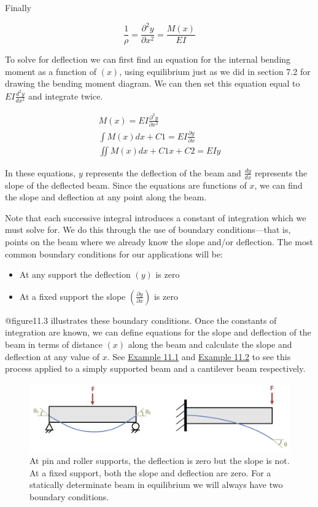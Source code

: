 \documentclass[
  letterpaper,
  DIV=11,
  numbers=noendperiod]{scrreprt}
\begin{document}
Finally

\[
\frac{1}{\rho}=\frac{\partial^{2} y}{\partial x^{2}}=\frac{M(x)}{E I}
\]

To solve for deflection we can first find an equation for the internal
bending moment as a function of \((x)\), using equilibrium just as we
did in section 7.2 for drawing the bending moment diagram. We can then
set this equation equal to \(E I \frac{d^{2} y}{d x^{2}}\) and integrate
twice.

\[
\begin{gathered}
M(x)=E I \frac{\partial^{2} y}{\partial x^{2}} \\
\int M(x) d x+C 1=E I \frac{\partial y}{\partial x} \\
\iint M(x) d x+C 1 x+C 2=E I y
\end{gathered}
\]

In these equations, \(y\) represents the deflection of the beam and
\(\frac{d y}{d x}\) represents the slope of the deflected beam. Since
the equations are functions of \(x\), we can find the slope and
deflection at any point along the beam.

Note that each successive integral introduces a constant of integration
which we must solve for. We do this through the use of boundary
conditions---that is, points on the beam where we already know the slope
and/or deflection. The most common boundary conditions for our
applications will be:

\begin{itemize}
\item
  At any support the deflection \((y)\) is zero
\item
  At a fixed support the slope
  \(\left(\frac{\partial y}{\partial x}\right)\) is zero
\end{itemize}

@figure11.3 illustrates these boundary conditions. Once the constants of
integration are known, we can define equations for the slope and
deflection of the beam in terms of distance \((x)\) along the beam and
calculate the slope and deflection at any value of \(x\). See
\hyperref[example-11.1]{Example 11.1} and
\hyperref[example-11.2]{Example 11.2} to see this process applied to a
simply supported beam and a cantilever beam respectively.

\begin{figure}

{\centering \includegraphics{images/CH11 PNGs/11.3.png}

}

\caption{At pin and roller supports, the deflection is zero but the
slope is not. At a fixed support, both the slope and deflection are
zero. For a statically determinate beam in equilibrium we will always
have two boundary conditions.}

\end{figure}%
\end{document}
